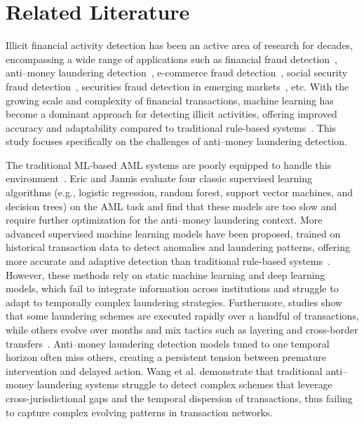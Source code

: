 \documentclass[11pt,english]{article}
\begin{document}

\section{Related Literature}
Illicit financial activity detection has been an active area of research for decades, encompassing a wide range of applications such as financial fraud detection~\parencite{fan2025unearthing, yiu2014deterrence, wu2024fair}, anti–money laundering detection~\parencite{deprez2025network}, e-commerce fraud detection~\parencite{nanduri2020microsoft, luca2016fake}, social security fraud detection~\parencite{van2017gotcha}, securities fraud detection in emerging markets~\parencite{guo2022hierarchical}, etc. With the growing scale and complexity of financial transactions, machine learning has become a dominant approach for detecting illicit activities, offering improved accuracy and adaptability compared to traditional rule-based systems~\parencite{august2025impact, fan2025unearthing, cecchini2010detecting, xiao2023black}. This study focuses specifically on the challenges of anti–money laundering detection.

The traditional ML-based AML systems are poorly equipped to handle this environment~\parencite{pettersson2022combating, alotibi2022money, jensen2023fighting, lokanan2024predicting}. Eric and Jannis \parencite*{pettersson2022combating} evaluate four classic supervised learning algorithms (e.g., logistic regression, random forest, support vector machines, and decision trees) on the AML task and find that these models are too slow and require further optimization for the anti–money laundering context. More advanced supervised machine learning models have been proposed, trained on historical transaction data to detect anomalies and laundering patterns, offering more accurate and adaptive detection than traditional rule-based systems~\parencite{golightly2023securing}. However, these methods rely on static machine learning and deep learning models, which fail to integrate information across institutions and struggle to adapt to temporally complex laundering strategies. Furthermore, studies show that some laundering schemes are executed rapidly over a handful of transactions, while others evolve over months and mix tactics such as layering and cross-border transfers~\parencite{amoako2025exploring}. Anti–money laundering detection models tuned to one temporal horizon often miss others, creating a persistent tension between premature intervention and delayed action. Wang et al. \parencite*{wang2024temporal} demonstrate that traditional anti–money laundering systems struggle to detect complex schemes that leverage cross-jurisdictional gaps and the temporal dispersion of transactions, thus failing to capture complex evolving patterns in transaction networks. 
\end{document}
